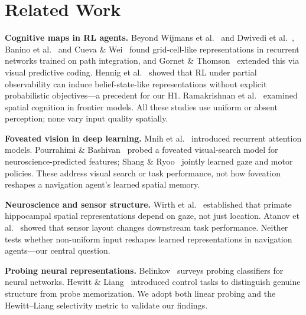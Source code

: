 \documentclass[10pt,conference,compsocconf]{IEEEtran}
\begin{document}
\section{Related Work}

\textbf{Cognitive maps in RL agents.}\quad
Beyond Wijmans et al.~\cite{wijmans2023emergence} and Dwivedi et al.~\cite{dwivedi2022isee}, Banino et al.~\cite{banino2018grid} and Cueva \& Wei~\cite{cueva2018grid} found grid-cell-like representations in recurrent networks trained on path integration, and Gornet \& Thomson~\cite{gornet2024cognitive} extended this via visual predictive coding. Hennig et al.~\cite{hennig2023belief} showed that RL under partial observability can induce belief-state-like representations without explicit probabilistic objectives---a precedent for our H1. Ramakrishnan et al.~\cite{ramakrishnan2025space} examined spatial cognition in frontier models. All these studies use uniform or absent perception; none vary input quality spatially.

\textbf{Foveated vision in deep learning.}\quad
Mnih et al.~\cite{mnih2014attention} introduced recurrent attention models. Pourrahimi \& Bashivan~\cite{pourrahimi2025foveated} probed a foveated visual-search model for neuroscience-predicted features; Shang \& Ryoo~\cite{shang2023sugarl} jointly learned gaze and motor policies. These address visual search or task performance, not how foveation reshapes a navigation agent's learned spatial memory.

\textbf{Neuroscience and sensor structure.}\quad
Wirth et al.~\cite{wirth2017gaze} established that primate hippocampal spatial representations depend on gaze, not just location. Atanov et al.~\cite{atanov2024photoreceptor} showed that sensor layout changes downstream task performance. Neither tests whether non-uniform input reshapes learned representations in navigation agents---our central question.

\textbf{Probing neural representations.}\quad
Belinkov~\cite{belinkov2022probing} surveys probing classifiers for neural networks. Hewitt \& Liang~\cite{hewitt2019control} introduced control tasks to distinguish genuine structure from probe memorization. We adopt both linear probing and the Hewitt--Liang selectivity metric to validate our findings.

\end{document}
